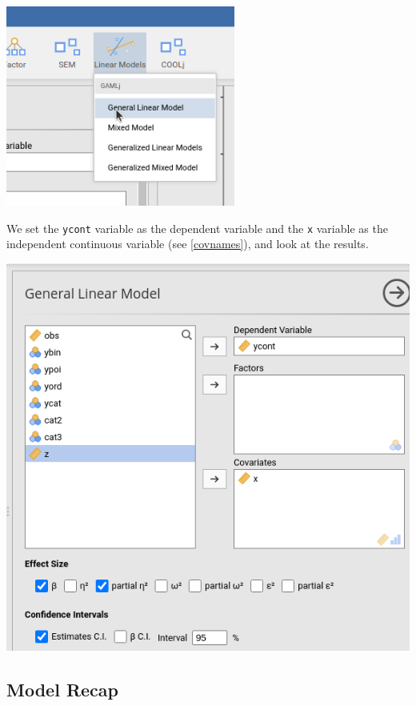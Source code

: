 \documentclass[
]{book}
\begin{document}
\includegraphics[width=0.9\linewidth]{bookletpics/2_menu1}

We set the \texttt{ycont} variable as the dependent variable and the \texttt{x} variable as the independent continuous variable (see \ref{covnames}), and look at the results.

\includegraphics[width=0.9\linewidth]{bookletpics/2_input1}

\hypertarget{model-recap}{%
\subsection{Model Recap}\label{model-recap}}
\end{document}
